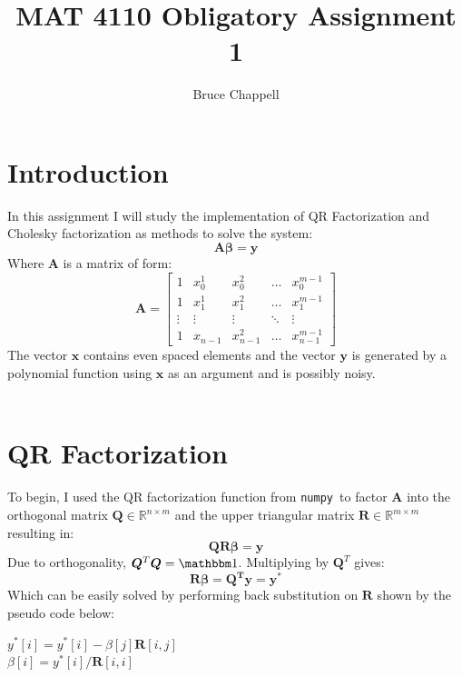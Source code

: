 \documentclass[11pt]{article}
\newcommand{\numpy}{{\tt numpy }}    %
\begin{document}
\author{Bruce Chappell}
\title{MAT 4110 Obligatory Assignment 1}
\maketitle

\medskip

\begin{enumerate}
\section{Introduction}
In this assignment I will study the implementation of QR Factorization and
Cholesky factorization as methods to solve the system:
\begin{equation}
    \label{norm}
    \bm{A \beta = y}
\end{equation}
Where $\bm{A}$ is a matrix of form:
\begin{equation}
    \bm{A} =
    \begin{bmatrix}
        1 & x_{0}^1 & x_{0}^2 & \dots  & x_{0}^{m-1} \\
        1 & x_{1}^1 & x_{1}^2 & \dots  & x_{1}^{m-1} \\
        \vdots     & \vdots  & \vdots & \ddots & \vdots \\
        1 & x_{n-1} & x_{n-1}^2   & \dots  & x_{n-1}^{m-1}
    \end{bmatrix}
\end{equation}
The vector $\bm x$ contains even spaced elements and the vector $\bm y$ is generated by a polynomial function using $\bm x$ as an argument and is possibly noisy.
\\
\\
\section{QR Factorization}
To begin, I used the QR factorization function from \numpy  to factor $\bm A$
into the orthogonal matrix $\bm Q \in \mathbb{R}^{n\times m}$ and the upper triangular matrix $\bm R \in \mathbb{R}^{m\times m}$ resulting in:
\begin{equation}
    \bm{Q R \beta = y}
\end{equation}
Due to orthogonality, $\bm Q^T \bm Q = \mathbbm 1$. Multiplying by $\bm Q^T$ gives:
\begin{equation}
    \bm{R \beta = Q^T y = y^{*}}
\end{equation}
Which can be easily solved by performing back substitution on $\bm R$ shown by the pseudo code below:
\begin{algorithm}
  \begin{algorithmic}[]
        \STATE $y^{*}[i]= y^{*}[i] - \beta[j]\bm R[i,j]$
      \ENDFOR\\
      $\beta[i] = y^{*}[i]/\bm R[i,i]$
    \ENDFOR
  \end{algorithmic}
\end{algorithm}\\


\end{enumerate}
\end{document}

